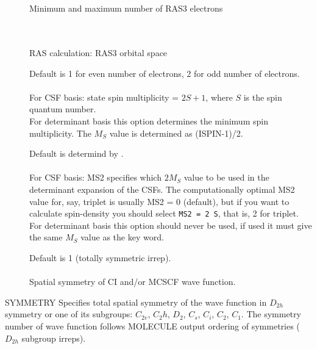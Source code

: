 \begin{description}
\item[] \ \\
    \\
   Minimum and maximum number of RAS3 electrons

\item[] \ \\
    \\
   RAS calculation: RAS3 orbital space

\item[]
  Default is 1 for even number of electrons, 2 for odd number of electrons. \\
  \\
  For CSF basis: state spin multiplicity = $2S + 1$,
  where $S$ is the spin quantum number. \\
  For determinant basis this option determines the minimum spin
  multiplicity.  The $M_S$ value is determined as (ISPIN-1)/2.

\item[]
  Default is determind by . \\
  \\
  For CSF basis: MS2 specifies which $2 M_S$ value to be used in the determinant expansion of the CSFs.
  The computationally optimal MS2 value for, say, triplet is usually MS2 = 0 (default), but if you want to calculate
  spin-density you should select \verb|MS2 = 2 S|, that is, 2 for triplet.\\
  For determinant basis this option should never be used, if used it must give the
  same $M_S$ value as the  key word.

\item[]
  Default is 1 (totally symmetric irrep).\\
   \\
  Spatial symmetry of CI and/or MCSCF wave function.

\end{description}


\noindent SYMMETRY   Specifies total spatial symmetry of the wave
function in $D_{2h}$ symmetry or one of its subgroups: $C_{2v}$, $C_2h$,
$D_2$, $C_s$, $C_i$, $C_2$, $C_1$. The  symmetry number of wave
function follows MOLECULE output ordering of symmetries ($D_{2h}$
subgroup irreps).

